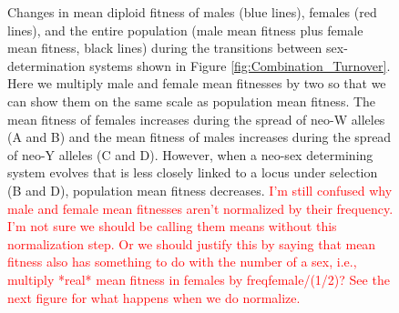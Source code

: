 \documentclass[12pt]{article}
\begin{document}
\begin{figure}[!h]
\centering
{}
\caption{
Changes in mean diploid fitness of males (blue lines), females (red lines), and the entire population (male mean fitness plus female mean fitness, black lines) during the transitions between sex-determination systems shown in Figure \ref{fig:Combination_Turnover}. 
Here we multiply male and female mean fitnesses by two so that we can show them on the same scale as population mean fitness. 
The mean fitness of females increases during the spread of neo-W alleles (A and B) and the mean fitness of males increases during the spread of neo-Y alleles (C and D). 
However, when a neo-sex determining system evolves that is less closely linked to a locus under selection (B and D), population mean fitness decreases. 
\textcolor{red}{I'm still confused why male and female mean fitnesses aren't normalized by their frequency. I'm not sure we should be calling them means without this normalization step. Or we should justify this by saying that mean fitness also has something to do with the number of a sex, i.e., multiply *real* mean fitness in females by freqfemale/(1/2)? See the next figure for what happens when we do normalize.}
}
\label{fig:Combination_MeanFit}
\end{figure}
\newpage
\end{document}
